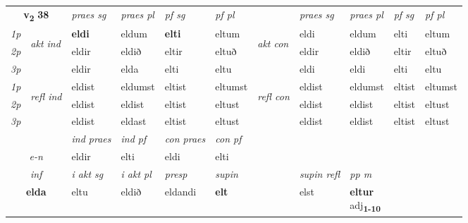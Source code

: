 \noindent
\begin{tabular}{lllllllllll} \toprule
\multicolumn{2}{c}{\textbf{v{\textsubscript{2}}} \Large{\textbf{38}}}  &  \textit{praes sg}  & \textit{praes pl}  &\textit{ pf sg} & \textit{pf pl} &  &  \textit{praes sg}  & \textit{praes pl}  & \textit{pf sg} & \textit{pf pl } \\*
	\cmidrule{3-6} \cmidrule{8-11}
 {\textit{1p}} & \multirow{3}{*}{\begin{turn}{90}\textit{akt ind}\end{turn}} & \textbf{eldi} & eldum & \textbf{elti} & eltum & \multirow{3}{*}{\begin{turn}{90}\textit{akt con}\end{turn}} &eldi & eldum & elti & eltum\\*
 {\textit{2p}} &  &  eldir  & eldið & eltir & eltuð & & eldir & eldið & eltir & eltuð \\*
{\textit{3p}} &  & eldir & elda & elti & eltu & & eldi & eldi& elti & eltu \\*
\cmidrule{3-6} \cmidrule{8-11}
 {\textit{1p}} & \multirow{3}{*}{\begin{turn}{90}\textit{refl ind}\end{turn}}  & eldist & eldumst & eltist & eltumst & \multirow{3}{*}{\begin{turn}{90}\textit{refl con}\end{turn}}  &eldist & eldumst & eltist & eltumst \\*
 {\textit{2p}} &  & eldist & eldist & eltist & eltust & &eldist & eldist & eltist & eltust \\*
 {\textit{3p}}  & & eldist & eldast & eltist & eltust & & eldist & eldist& eltist & eltust \\*
\cmidrule{3-6} \cmidrule{8-11}

   & &  \textit{ind praes} & \textit{ind pf} & \textit{con praes} & \textit{con pf} \\*
\multicolumn{2}{c}{ \textit{e-n} } & eldir & elti & eldi & elti \\*

\cmidrule{3-9}
   \multicolumn{2}{c}{\textit{inf}}  & \textit{i akt sg} & \textit{i akt pl}   & \textit{presp} & \textit{supin} && \textit{supin refl} & \textit{pp m} \\*
  \multicolumn{2}{c}{\textbf{elda}} & eltu  & eldið   & eldandi &  \textbf{elt} && elst & \specialcell{\textbf{eltur} \\ adj\textbf{\textsubscript{1-10}}} \\*
\end{tabular}

